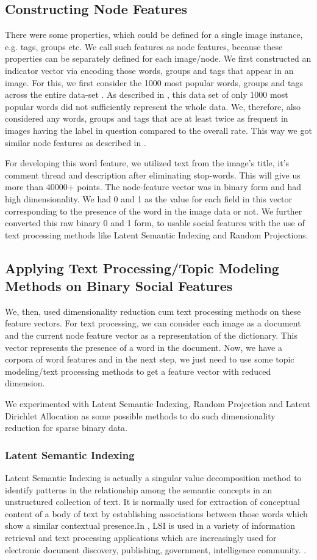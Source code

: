 \subsection{Constructing Node Features}
There were some properties, which could be defined for a single image instance, e.g. tags, groups etc. We call such features as node 
features, because these properties can be separately defined for each image/node. 
We first constructed an indicator vector via encoding those words, groups and tags that appear in an image. For this, we first consider the 1000 most popular words, groups and tags across the entire data-set . As described in , this data set of only 1000 most popular words did not sufficiently represent the whole data. We, therefore, also considered any words, groups and tags that are at least twice as frequent in images having the label in question compared to the overall rate. This way we got similar node features as described in \citet*{Jure}. 

For developing this word feature, we utilized text from the image's title, it's comment thread and description after eliminating stop-words.
This will give us more than 40000+ points. The node-feature vector was in binary form and had high dimensionality. We had 0 and 1 as the value for each field in this vector corresponding to the presence of the word in the image data or not. We further converted this raw binary 0 and 1 form, to usable social features with the use of text processing methods like Latent Semantic Indexing and Random 
Projections.
\subsection{Applying Text Processing/Topic Modeling Methods on Binary Social Features}
We, then, used dimensionality reduction cum text processing methods on these feature vectors. For text processing, we can consider 
each image as a document and the current node feature vector as a representation of the dictionary. This vector represents the presence of a word in the document. Now, we have a corpora of word features and in the next step, we just need to use some topic modeling/text processing methods to get a feature vector with reduced dimension.

We experimented with Latent Semantic Indexing, Random Projection and Latent Dirichlet Allocation as some possible methods to do such 
dimensionality reduction for sparse binary data.
\subsubsection{Latent Semantic Indexing}
Latent Semantic Indexing is actually a singular value decomposition method to identify patterns in the relationship among the semantic 
concepts in an unstructured collection of text. It is normally used for extraction of conceptual content of a body of text by establishing associations between those words which show a similar contextual presence.In \citet*{Deerwester}, LSI is used in a variety of information retrieval and text processing applications which are increasingly used for electronic document discovery, publishing, government, intelligence community. \citet*{e-discovery}.

